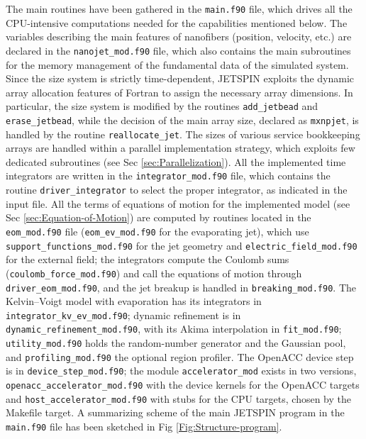The main routines have been gathered in the \texttt{main.f90} file,
which drives all the CPU-intensive computations needed for the capabilities
mentioned below. The variables describing the main features of nanofibers
(position, velocity, etc.) are declared in the \texttt{nanojet\_mod.f90}
file, which also contains the main subroutines for the memory management
of the fundamental data of the simulated system. Since the size system
is strictly time-dependent, JETSPIN exploits the dynamic array allocation
features of Fortran to assign the necessary array dimensions. In
particular, the size system is modified by the routines \texttt{add\_jetbead}
and \texttt{erase\_jetbead}, while the decision of the main array
size, declared as \texttt{mxnpjet}, is handled by the routine \texttt{reallocate\_jet}.
The sizes of various service bookkeeping arrays are handled within
a parallel implementation strategy, which exploits few dedicated subroutines
(see Sec \ref{sec:Parallelization}). All the implemented time integrators
are written in the \texttt{integrator\_mod.f90} file, which contains
the routine \texttt{driver\_integrator} to select the proper integrator,
as indicated in the input file. All the terms of equations of motion
for the implemented model (see Sec \ref{sec:Equation-of-Motion})
are computed by routines located in the \texttt{eom\_mod.f90} file
(\texttt{eom\_ev\_mod.f90} for the evaporating jet), which use
\texttt{support\_functions\_mod.f90} for the jet geometry and
\texttt{electric\_field\_mod.f90} for the external field; the integrators
compute the Coulomb sums (\texttt{coulomb\_force\_mod.f90}) and call the
equations of motion through \texttt{driver\_eom\_mod.f90}, and the jet
breakup is handled in \texttt{breaking\_mod.f90}. The Kelvin--Voigt
model with evaporation has its integrators in
\texttt{integrator\_kv\_ev\_mod.f90}; dynamic refinement is in
\texttt{dynamic\_refinement\_mod.f90}, with its Akima interpolation in
\texttt{fit\_mod.f90}; \texttt{utility\_mod.f90} holds the random-number
generator and the Gaussian pool, and \texttt{profiling\_mod.f90} the
optional region profiler. The OpenACC device step is in
\texttt{device\_step\_mod.f90}; the module \texttt{accelerator\_mod} exists
in two versions, \texttt{openacc\_accelerator\_mod.f90} with the device
kernels for the OpenACC targets and \texttt{host\_accelerator\_mod.f90} with
stubs for the CPU targets, chosen by the Makefile target.
A summarizing scheme of the main JETSPIN program in the \texttt{main.f90}
file has been sketched in Fig \ref{Fig:Structure-program}.

